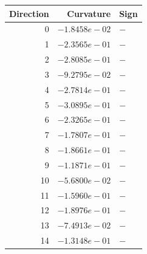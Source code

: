 \begin{tabular}{rrl}
\toprule
Direction & Curvature & Sign \\
\midrule
0 & $-1.8458e-02$ & $-$ \\
1 & $-2.3565e-01$ & $-$ \\
2 & $-2.8085e-01$ & $-$ \\
3 & $-9.2795e-02$ & $-$ \\
4 & $-2.7814e-01$ & $-$ \\
5 & $-3.0895e-01$ & $-$ \\
6 & $-2.3265e-01$ & $-$ \\
7 & $-1.7807e-01$ & $-$ \\
8 & $-1.8661e-01$ & $-$ \\
9 & $-1.1871e-01$ & $-$ \\
10 & $-5.6800e-02$ & $-$ \\
11 & $-1.5960e-01$ & $-$ \\
12 & $-1.8976e-01$ & $-$ \\
13 & $-7.4913e-02$ & $-$ \\
14 & $-1.3148e-01$ & $-$ \\
\bottomrule
\end{tabular}
